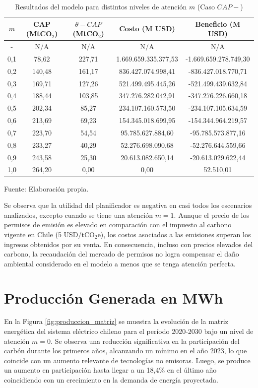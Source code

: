 \begin{table}[H]
\centering
\small
\caption{Resultados del modelo para distintos niveles de atención $m$ (Caso $CAP-$)}
\label{tab:resultados_m_2}
\renewcommand{\arraystretch}{1.1}
\setlength{\tabcolsep}{6pt}

\begin{tabular}{ccccc}
\toprule
$m$ & CAP (MtCO$_2$) & $\theta-CAP$ (MtCO$_2$) & Costo (M USD) & Beneficio (M USD) \\
\midrule
-    & N/A   & N/A   & N/A & N/A \\
0,1 & 78,62 & 227,71 & 1.669.659.335.377,53 & -1.669.659.278.749,30 \\
0,2 & 140,48 & 161,17 & 836.427.074.998,41 & -836.427.018.770,71 \\
0,3 & 169,71 & 127,26 & 521.499.495.445,26 & -521.499.439.632,84 \\
0,4 & 188,44 & 103,85 & 347.276.282.042,91 & -347.276.226.660,18 \\
0,5 & 202,34 & 85,27 & 234.107.160.573,50 & -234.107.105.634,59 \\
0,6 & 213,69 & 69,23 & 154.345.018.699,95 & -154.344.964.219,57 \\
0,7 & 223,70 & 54,54 & 95.785.627.884,60 & -95.785.573.877,16 \\
0,8 & 233,27 & 40,29 & 52.276.698.090,68 & -52.276.644.559,66 \\
0,9 & 243,58 & 25,30 & 20.613.082.650,14 & -20.613.029.622,44 \\
1,0 & 264,20 & 0,00 & 0,00 & 52.510,01 \\
\bottomrule
\end{tabular}

\vspace{0.3cm}
\footnotesize Fuente: Elaboración propia.

\end{table}

Se observa que la utilidad del planificador es negativa en casi todos los escenarios analizados, excepto cuando se tiene una atención $m=1$. Aunque el precio de los permisos de emisión es elevado en comparación con el impuesto al carbono vigente en Chile (5 USD/tCO$_2$e), los costos asociados a las emisiones superan los ingresos obtenidos por su venta. En consecuencia, incluso con precios elevados del carbono, la recaudación del mercado de permisos no logra compensar el daño ambiental considerado en el modelo a menos que se tenga atención perfecta. 

\section{Producción Generada en MWh}
En la Figura \ref{fig:produccion_matriz} se muestra la evolución de la matriz energética del sistema eléctrico chileno para el período 2020-2030 bajo un nivel de atención $m = 0$. Se observa una reducción significativa en la participación del carbón durante los primeros años, alcanzando un mínimo en el año 2023, lo que coincide con un aumento relevante de tecnologías no emisoras. Luego, se produce un aumento en participación hasta llegar a un 18,4\% en el último año coincidiendo con un crecimiento en la demanda de energía proyectada.\medskip

